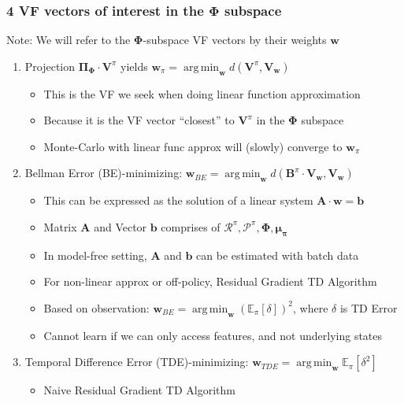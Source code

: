 \documentclass[handout]{beamer}
\newcommand{\vw}{\bm{V_w}}
\newcommand{\vpi}{\bm{V}^{\pi}}
\newcommand{\bphi}{\bm{\Phi}}
\newcommand{\bb}{\bm{B}^{\pi}}
\newcommand{\bpi}{\bm{\Pi_{\Phi}}}
\newcommand{\bmu}{\bm{\mu_{\pi}}}
\newcommand{\bw}{\bm{w}}
\newcommand{\brew}{\bm{\mathcal{R}}^{\pi}}
\newcommand{\bprob}{\bm{\mathcal{P}}^{\pi}}
\DeclareMathOperator*{\argmin}{arg\,min}
\newcounter{sauvegardeenumi}
\newcommand{\asuivre}{\setcounter{sauvegardeenumi}{\theenumi}}
\begin{document}
\begin{frame}
\frametitle{4 VF vectors of interest in the $\bphi$ subspace}
Note: We will refer to the $\bphi$-subspace VF vectors by their weights $\bw$
\pause
\begin{enumerate}[<+->]
\item Projection $\bpi \cdot \vpi$ yields $\bm{w}_{\pi} = \argmin_{\bw} d(\vpi, \vw)$
\begin{itemize}[<+->]
\item This is the VF we seek when doing linear function approximation
\item Because it is the VF vector ``closest'' to $\vpi$ in the $\bphi$ subspace
\item Monte-Carlo with linear func approx will (slowly) converge to $\bw_{\pi}$
\end{itemize}

\item Bellman Error (BE)-minimizing: $\bm{w}_{BE} = \argmin_{\bw} d(\bb \cdot \vw, \vw)$
\begin{itemize}[<+->]
\item This can be expressed as the solution of a linear system $\bm{A} \cdot \bm{w} = \bm{b}$ 
\item Matrix $\bm{A}$ and Vector $\bm{b}$ comprises of $\brew, \bprob, \bphi, \bmu$
\item In model-free setting, $\bm{A}$ and $\bm{b}$ can be estimated with batch data
\item For non-linear approx or off-policy, Residual Gradient TD Algorithm
\item Based on observation: $\bm{w}_{BE} = \argmin_{\bw} (\mathbb{E}_{\pi} [\delta])^2$, where $\delta$ is TD Error 
\item Cannot learn if we can only access features, and not underlying states
\end{itemize}

\item Temporal Difference Error (TDE)-minimizing: $\bm{w}_{TDE} = \argmin_{\bw} \mathbb{E}_{\pi} [\delta^2]$
\begin{itemize}
\item Naive Residual Gradient TD Algorithm
\end{itemize}

\asuivre

\end{enumerate}

\end{frame}
\end{document}
